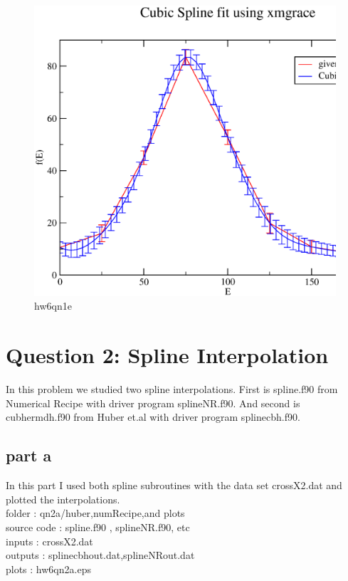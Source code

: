 \documentclass[11pt,a4paper,english]{article}
\begin{document}
	\begin{figure}[h!]
	\centering
	\includegraphics [scale=0.6]{hw6qn1e.eps}
	\caption{hw6qn1e }
	\end{figure}
	\clearpage

	
\section{Question 2: Spline Interpolation}
In this problem we studied two spline interpolations. First is spline.f90 from Numerical Recipe with driver program splineNR.f90.
And second is cubhermdh.f90 from Huber et.al with driver program splinecbh.f90. 

	
	\subsection{part a}
In this part I used both spline subroutines with the data set crossX2.dat and plotted the interpolations.\\
    folder       : qn2a/huber,numRecipe,and plots\\
	source code  : spline.f90 , splineNR.f90, etc\\
	inputs       : crossX2.dat\\
	outputs      : splinecbhout.dat,splineNRout.dat\\
	plots        : hw6qn2a.eps\\
	
\end{document}
